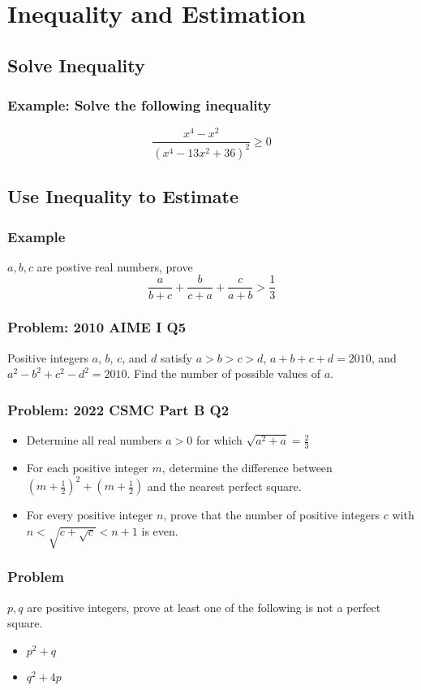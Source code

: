 \documentclass{article}
\begin{document}
\section{Inequality and Estimation}

\subsection{Solve Inequality}

\subsubsection{Example: Solve the following inequality}
$$\frac{x^4-x^2}{(x^4-13x^2+36)^2} \ge 0$$
\vspace{60px}

\subsection{Use Inequality to Estimate}
\subsubsection{Example}
$a,b,c$ are postive real numbers, prove
$$\frac{a}{b+c}+\frac{b}{c+a}+\frac{c}{a+b} > \frac{1}{3}$$
\vspace{60px}

\subsubsection{Problem: 2010 AIME I Q5}
Positive integers $a$, $b$, $c$, and $d$ satisfy $a > b > c > d$, $a + b + c + d = 2010$, and $a^2 - b^2 + c^2 - d^2 = 2010$. Find the number of possible values of $a$.
\vspace{60px}

\pagebreak

\subsubsection{Problem: 2022 CSMC Part B Q2}

\begin{itemize}
    \item  Determine all real numbers $a > 0$ for which $\sqrt{a^2+a}=\frac{2}{3}$
    \item  For each positive integer $m$, determine the difference between $(m+\frac{1}{2})^2+(m+\frac{1}{2})$ and the nearest perfect square.
    \item  For every positive integer $n$, prove that the number of positive integers $c$ with $n<\sqrt{c+\sqrt{c}}<n+1$ is even.
\end{itemize}

\pagebreak
\subsubsection{Problem}
$p, q$ are positive integers, prove at least one of the following is not a perfect square.
\begin{itemize}
    \item $p^2+q$
    \item $q^2+4p$
\end{itemize}
\end{document}
